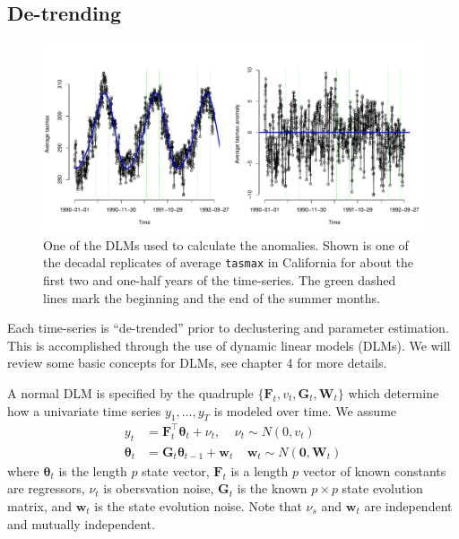 \documentclass[12pt]{article}
\newcommand{\m}[1]{\mathbf{\bm{#1}}}
\begin{document}
\subsection{De-trending}
\label{anomaly}

\begin{figure}
\begin{center}
\includegraphics[scale=0.50]{figs/dlm.pdf}
\end{center}
\caption{One of the DLMs used to calculate the anomalies. Shown is one of the decadal replicates of average \texttt{tasmax} in California for about the first two and one-half years of the time-series. The green dashed lines mark the beginning and the end of the summer months.}
\label{dlm_fig}
\end{figure}

Each time-series is ``de-trended'' prior to declustering and parameter estimation. This is accomplished through the use of dynamic linear models (DLMs). We will review some basic concepts for DLMs, see \cite{prado2010time} chapter 4 for more details.

A normal DLM is specified by the quadruple $\{\m{F}_t, v_t, \m{G}_t, \m{W}_t\}$ which determine how a univariate time series $y_1,\ldots,y_T$ is modeled over time. We assume
\begin{align}
y_t &= \m{F}_t^\top\m{\theta}_t + \nu_t,~~~~~\nu_t\sim N(0, v_t) \label{dlm_model} \\
\m{\theta}_t &= \m{G}_t\m{\theta}_{t-1}+\m{w}_t~~~~~\m{w}_t\sim N(\m{0}, \m{W}_t) \nonumber
\end{align}
where $\m{\theta}_t$ is the length $p$ state vector, $\m{F}_t$ is a length $p$ vector of known constants are regressors, $\nu_t$ is obersvation noise, $\m{G}_t$ is the known $p\times p$ state evolution matrix, and $\m{w}_t$ is the state evolution noise. Note that $\nu_s$ and $\m{w}_t$ are independent and mutually independent.
\end{document}
